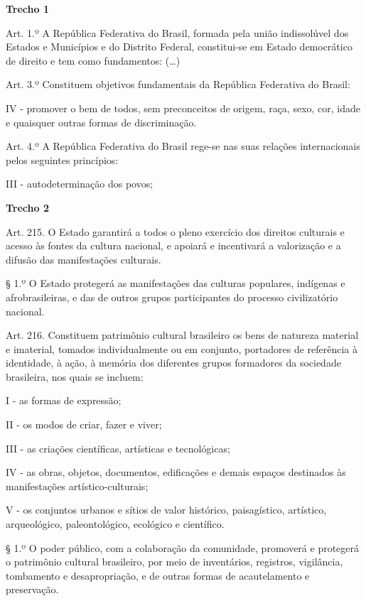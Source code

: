 \begin{myquote}

\textbf{Trecho 1}

Art. 1.º A República Federativa do Brasil, formada pela união
indissolúvel dos Estados e Municípios e do Distrito Federal,
constitui-se em Estado democrático de direito e tem como fundamentos: (\ldots{})

Art. 3.º Constituem objetivos fundamentais da República Federativa do
Brasil:

IV - promover o bem de todos, sem preconceitos de origem, raça, sexo,
cor, idade e quaisquer outras formas de discriminação.

Art. 4.º A República Federativa do Brasil rege-se nas suas relações
internacionais pelos seguintes princípios:

III - autodeterminação dos povos;

\textbf{Trecho 2}

Art. 215. O Estado garantirá a todos o pleno exercício dos direitos
culturais e acesso às fontes da cultura nacional, e apoiará e
incentivará a valorização e a difusão das manifestações culturais.

§ 1.º O Estado protegerá as manifestações das culturas populares,
indígenas e afrobrasileiras, e das de outros grupos participantes do
processo civilizatório nacional. 

Art. 216. Constituem patrimônio
cultural brasileiro os bens de natureza material e imaterial, tomados
individualmente ou em conjunto, portadores de referência à identidade, à
ação, à memória dos diferentes grupos formadores da sociedade
brasileira, nos quais se incluem:

I - as formas de expressão;

II - os modos de criar, fazer e viver;

III - as criações científicas, artísticas e tecnológicas;

IV - as obras, objetos, documentos, edificações e demais espaços
destinados às manifestações artístico-culturais;

V - os conjuntos urbanos e sítios de valor histórico, paisagístico,
artístico, arqueológico, paleontológico, ecológico e científico.

§ 1.º O poder público, com a colaboração da comunidade, promoverá e
protegerá o patrimônio cultural brasileiro, por meio de inventários,
registros, vigilância, tombamento e desapropriação, e de outras formas
de acautelamento e preservação. \\


\end{myquote}

